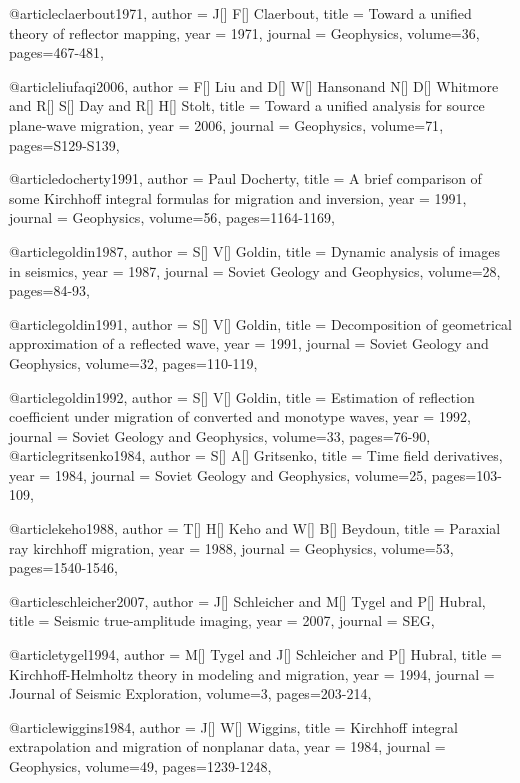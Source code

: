 {@article{claerbout1971,
  author =	 {J[] F[] Claerbout},
  title =	 {Toward a unified theory of reflector mapping},
  year =	 1971,
  journal =	 {Geophysics},
  volume={36},
 pages=467-481,
}

@article{liufaqi2006,
  author =	 {F[] Liu and D[] W[] Hansonand N[] D[] Whitmore and R[] S[] Day and R[] H[] Stolt},
  title =	 {Toward a unified analysis for source plane-wave migration},
  year =	 2006,
  journal =	 {Geophysics},
  volume={71},
 pages=S129-S139,
}

@article{docherty1991,
  author =	 {Paul Docherty},
  title =	 {A brief comparison of some Kirchhoff integral formulas for migration and inversion},
  year =	 1991,
  journal =	 {Geophysics},
  volume={56},
 pages=1164-1169,
}

@article{goldin1987,
  author =	 {S[] V[] Goldin},
  title =	 {Dynamic analysis of images in seismics},
  year =	 1987,
  journal =	 {Soviet Geology and Geophysics},
  volume={28},
 pages=84-93,
}

@article{goldin1991,
  author =	 {S[] V[] Goldin},
  title =	 {Decomposition of geometrical approximation of a reflected wave},
  year =	 1991,
  journal =	 {Soviet Geology and Geophysics},
  volume={32},
 pages=110-119,
}

@article{goldin1992,
  author =	 {S[] V[] Goldin},
  title =	 {Estimation of reflection coefficient under migration of converted and monotype waves},
  year =	 1992,
  journal =	 {Soviet Geology and Geophysics},
  volume={33},
 pages=76-90,
}
@article{gritsenko1984,
  author =	 {S[] A[] Gritsenko},
  title =	 {Time field derivatives},
  year =	 1984,
  journal =	 {Soviet Geology and Geophysics},
  volume={25},
 pages=103-109,
}

@article{keho1988,
  author =	 {T[] H[] Keho and W[] B[] Beydoun},
  title =	 {Paraxial ray kirchhoff migration},
  year =	 1988,
  journal =	 {Geophysics},
  volume={53},
 pages=1540-1546,
}

@article{schleicher2007,
  author =	 {J[] Schleicher and M[] Tygel and P[] Hubral},
  title =	 {Seismic true-amplitude imaging},
  year =	 2007,
  journal =	 {SEG},
}

@article{tygel1994,
  author =	 {M[] Tygel and J[] Schleicher and P[] Hubral},
  title =	 {Kirchhoff-Helmholtz theory in modeling and migration},
  year =	 1994,
  journal =	 {Journal of Seismic Exploration},
  volume={3},
 pages=203-214,
}

@article{wiggins1984,
  author =	 {J[] W[] Wiggins},
  title =	 {Kirchhoff integral extrapolation and migration of nonplanar data},
  year =	 1984,
  journal =	 {Geophysics},
  volume={49},
 pages=1239-1248,
}

}
